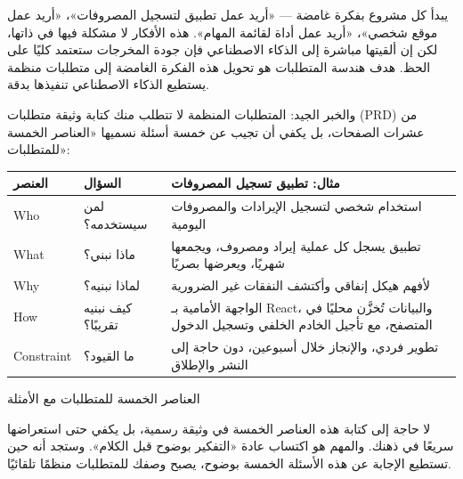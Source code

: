 


يبدأ كل مشروع بفكرة غامضة — «أريد عمل تطبيق لتسجيل المصروفات»، «أريد عمل موقع شخصي»، «أريد عمل أداة لقائمة المهام». هذه الأفكار لا مشكلة فيها في ذاتها، لكن إن ألقيتها مباشرة إلى الذكاء الاصطناعي فإن جودة المخرجات ستعتمد كليًا على الحظ. هدف هندسة المتطلبات هو تحويل هذه الفكرة الغامضة إلى متطلبات منظمة يستطيع الذكاء الاصطناعي تنفيذها بدقة.

والخبر الجيد: المتطلبات المنظمة لا تتطلب منك كتابة وثيقة متطلبات (PRD) من عشرات الصفحات، بل يكفي أن تجيب عن خمسة أسئلة نسميها «العناصر الخمسة للمتطلبات»:

\begin{center}
\begin{tabularx}{\linewidth}{|X|X|X|}
\hline
\textbf{العنصر} & \textbf{السؤال} & \textbf{مثال: تطبيق تسجيل المصروفات} \tabularnewline
\hline
Who & لمن سيستخدمه؟ & استخدام شخصي لتسجيل الإيرادات والمصروفات اليومية \tabularnewline
What & ماذا نبني؟ & تطبيق يسجل كل عملية إيراد ومصروف، ويجمعها شهريًا، ويعرضها بصريًا \tabularnewline
Why & لماذا نبنيه؟ & لأفهم هيكل إنفاقي وأكتشف النفقات غير الضرورية \tabularnewline
How & كيف نبنيه تقريبًا؟ & الواجهة الأمامية بـ React، والبيانات تُخزَّن محليًا في المتصفح، مع تأجيل الخادم الخلفي وتسجيل الدخول \tabularnewline
Constraint & ما القيود؟ & تطوير فردي، والإنجاز خلال أسبوعين، دون حاجة إلى النشر والإطلاق \tabularnewline
\hline
\end{tabularx}
\end{center}

\begin{center}\small\color{gray}العناصر الخمسة للمتطلبات مع الأمثلة\end{center}

لا حاجة إلى كتابة هذه العناصر الخمسة في وثيقة رسمية، بل يكفي حتى استعراضها سريعًا في ذهنك. والمهم هو اكتساب عادة «التفكير بوضوح قبل الكلام». وستجد أنه حين تستطيع الإجابة عن هذه الأسئلة الخمسة بوضوح، يصبح وصفك للمتطلبات منظمًا تلقائيًا.

